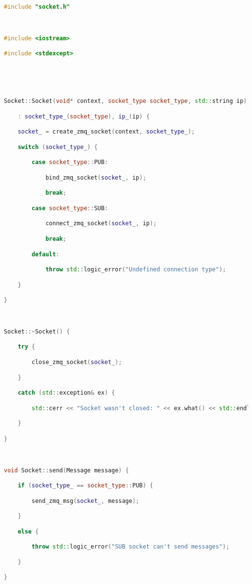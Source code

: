 \begin{lstlisting}[language=C++]

#include "socket.h"



#include <iostream>

#include <stdexcept>





Socket::Socket(void* context, socket_type socket_type, std::string ip)

    : socket_type_(socket_type), ip_(ip) {

    socket_ = create_zmq_socket(context, socket_type_);

    switch (socket_type_) {

        case socket_type::PUB:

            bind_zmq_socket(socket_, ip);

            break;

        case socket_type::SUB:

            connect_zmq_socket(socket_, ip);

            break;

        default:

            throw std::logic_error("Undefined connection type");

    }

}



Socket::~Socket() {

    try {

        close_zmq_socket(socket_);

    } 

    catch (std::exception& ex) {

        std::cerr << "Socket wasn't closed: " << ex.what() << std::endl;

    }

}



void Socket::send(Message message) {

    if (socket_type_ == socket_type::PUB) {

        send_zmq_msg(socket_, message);

    } 

    else {

        throw std::logic_error("SUB socket can't send messages");

    }

}




\end{lstlisting}
